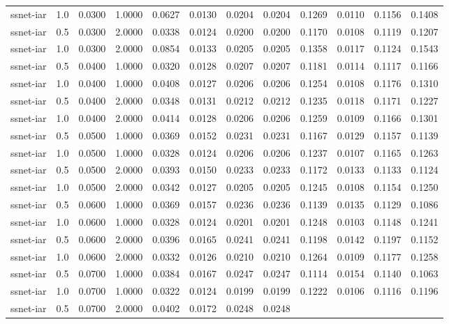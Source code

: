\documentclass[
]{article}
\begin{document}
\begin{longtable}[]{@{}lrrrrrrrrrrr@{}}
ssnet-iar & 1.0 & 0.0300 & 1.0000 & 0.0627 & 0.0130 & 0.0204 & 0.0204 &
0.1269 & 0.0110 & 0.1156 & 0.1408 \\
ssnet-iar & 0.5 & 0.0300 & 2.0000 & 0.0338 & 0.0124 & 0.0200 & 0.0200 &
0.1170 & 0.0108 & 0.1119 & 0.1207 \\
ssnet-iar & 1.0 & 0.0300 & 2.0000 & 0.0854 & 0.0133 & 0.0205 & 0.0205 &
0.1358 & 0.0117 & 0.1124 & 0.1543 \\
ssnet-iar & 0.5 & 0.0400 & 1.0000 & 0.0320 & 0.0128 & 0.0207 & 0.0207 &
0.1181 & 0.0114 & 0.1117 & 0.1166 \\
ssnet-iar & 1.0 & 0.0400 & 1.0000 & 0.0408 & 0.0127 & 0.0206 & 0.0206 &
0.1254 & 0.0108 & 0.1176 & 0.1310 \\
ssnet-iar & 0.5 & 0.0400 & 2.0000 & 0.0348 & 0.0131 & 0.0212 & 0.0212 &
0.1235 & 0.0118 & 0.1171 & 0.1227 \\
ssnet-iar & 1.0 & 0.0400 & 2.0000 & 0.0414 & 0.0128 & 0.0206 & 0.0206 &
0.1259 & 0.0109 & 0.1166 & 0.1301 \\
ssnet-iar & 0.5 & 0.0500 & 1.0000 & 0.0369 & 0.0152 & 0.0231 & 0.0231 &
0.1167 & 0.0129 & 0.1157 & 0.1139 \\
ssnet-iar & 1.0 & 0.0500 & 1.0000 & 0.0328 & 0.0124 & 0.0206 & 0.0206 &
0.1237 & 0.0107 & 0.1165 & 0.1263 \\
ssnet-iar & 0.5 & 0.0500 & 2.0000 & 0.0393 & 0.0150 & 0.0233 & 0.0233 &
0.1172 & 0.0133 & 0.1133 & 0.1124 \\
ssnet-iar & 1.0 & 0.0500 & 2.0000 & 0.0342 & 0.0127 & 0.0205 & 0.0205 &
0.1245 & 0.0108 & 0.1154 & 0.1250 \\
ssnet-iar & 0.5 & 0.0600 & 1.0000 & 0.0369 & 0.0157 & 0.0236 & 0.0236 &
0.1139 & 0.0135 & 0.1129 & 0.1086 \\
ssnet-iar & 1.0 & 0.0600 & 1.0000 & 0.0328 & 0.0124 & 0.0201 & 0.0201 &
0.1248 & 0.0103 & 0.1148 & 0.1241 \\
ssnet-iar & 0.5 & 0.0600 & 2.0000 & 0.0396 & 0.0165 & 0.0241 & 0.0241 &
0.1198 & 0.0142 & 0.1197 & 0.1152 \\
ssnet-iar & 1.0 & 0.0600 & 2.0000 & 0.0332 & 0.0126 & 0.0210 & 0.0210 &
0.1264 & 0.0109 & 0.1177 & 0.1258 \\
ssnet-iar & 0.5 & 0.0700 & 1.0000 & 0.0384 & 0.0167 & 0.0247 & 0.0247 &
0.1114 & 0.0154 & 0.1140 & 0.1063 \\
ssnet-iar & 1.0 & 0.0700 & 1.0000 & 0.0322 & 0.0124 & 0.0199 & 0.0199 &
0.1222 & 0.0106 & 0.1116 & 0.1196 \\
ssnet-iar & 0.5 & 0.0700 & 2.0000 & 0.0402 & 0.0172 & 0.0248 & 0.0248 &

\end{longtable}
\end{document}
